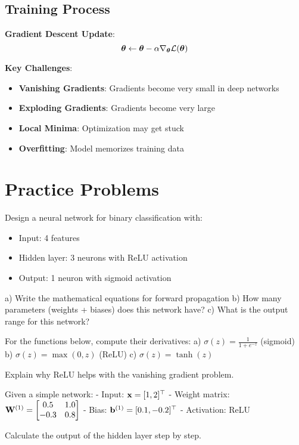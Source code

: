 \documentclass{article}
\begin{document}
\subsection{Training Process}

\textbf{Gradient Descent Update}:
$$\boldsymbol{\theta} \leftarrow \boldsymbol{\theta} - \alpha \nabla_{\boldsymbol{\theta}} \mathcal{L}(\boldsymbol{\theta})$$

\textbf{Key Challenges}:
\begin{itemize}
    \item \textbf{Vanishing Gradients}: Gradients become very small in deep networks
    \item \textbf{Exploding Gradients}: Gradients become very large
    \item \textbf{Local Minima}: Optimization may get stuck
    \item \textbf{Overfitting}: Model memorizes training data
\end{itemize}

\section{Practice Problems}

\begin{problembox}[title=Basic Neural Network Architecture]

Design a neural network for binary classification with:
\begin{itemize}
    \item Input: 4 features
    \item Hidden layer: 3 neurons with ReLU activation
    \item Output: 1 neuron with sigmoid activation
\end{itemize}

a) Write the mathematical equations for forward propagation
b) How many parameters (weights + biases) does this network have?
c) What is the output range for this network?
\end{problembox}

\begin{problembox}[title= Activation Function Analysis]

For the functions below, compute their derivatives:
a) $\sigma(z) = \frac{1}{1 + e^{-z}}$ (sigmoid)
b) $\sigma(z) = \max(0, z)$ (ReLU)
c) $\sigma(z) = \tanh(z)$

Explain why ReLU helps with the vanishing gradient problem.
\end{problembox}

\begin{problembox}[title= Forward Propagation Calculation]

Given a simple network:
- Input: $\mathbf{x} = [1, 2]^\top$
- Weight matrix: $\mathbf{W}^{(1)} = \begin{bmatrix} 0.5 & 1.0 \\ -0.3 & 0.8 \end{bmatrix}$
- Bias: $\mathbf{b}^{(1)} = [0.1, -0.2]^\top$
- Activation: ReLU

Calculate the output of the hidden layer step by step.
\end{problembox}
\end{document}
